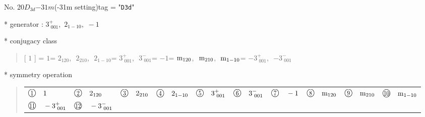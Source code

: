 \documentclass[fleqn,10pt,landscape]{jsarticle}
\begin{document}
\newpage

No. 20\quad$D_{3d}$\quad$-31m$\quad(-31m setting)\quad[ trigonal ]
tag = "{\tt D3d}"

* generator : $3^{+}_{\,\,001},\,\,2{}_{1-10},\,\,-1$

* conjugacy class
\begin{quote}
[ $1$ ] = \quad $1$\newline[ $2{}_{120}$ ] = \quad $2{}_{120}$,\,\, $2{}_{210}$,\,\, $2{}_{1-10}$\newline[ $3^{+}_{\,\,001}$ ] = \quad $3^{+}_{\,\,001}$,\,\, $3^{-}_{\,\,001}$\newline[ $-1$ ] = \quad $-1$\newline[ ${\rm m}_{120}$ ] = \quad ${\rm m}_{120}$,\,\, ${\rm m}_{210}$,\,\, ${\rm m}_{1-10}$\newline[ $-3^{+}_{\,\,001}$ ] = \quad $-3^{+}_{\,\,001}$,\,\, $-3^{-}_{\,\,001}$\newline
\end{quote}

* symmetry operation
\begin{quote}
\begin{tabular}{llllllllll}
$ {\ooalign{\hfil\resizebox{.8\width}{\height}{1}\hfil\crcr\raise.1ex\hbox{\large$\bigcirc$}}}\quad 1 $ & $ {\ooalign{\hfil\resizebox{.8\width}{\height}{2}\hfil\crcr\raise.1ex\hbox{\large$\bigcirc$}}}\quad 2{}_{120} $ & $ {\ooalign{\hfil\resizebox{.8\width}{\height}{3}\hfil\crcr\raise.1ex\hbox{\large$\bigcirc$}}}\quad 2{}_{210} $ & $ {\ooalign{\hfil\resizebox{.8\width}{\height}{4}\hfil\crcr\raise.1ex\hbox{\large$\bigcirc$}}}\quad 2{}_{1-10} $ & $ {\ooalign{\hfil\resizebox{.8\width}{\height}{5}\hfil\crcr\raise.1ex\hbox{\large$\bigcirc$}}}\quad 3^{+}_{\,\,001} $ & $ {\ooalign{\hfil\resizebox{.8\width}{\height}{6}\hfil\crcr\raise.1ex\hbox{\large$\bigcirc$}}}\quad 3^{-}_{\,\,001} $ & $ {\ooalign{\hfil\resizebox{.8\width}{\height}{7}\hfil\crcr\raise.1ex\hbox{\large$\bigcirc$}}}\quad -1 $ & $ {\ooalign{\hfil\resizebox{.8\width}{\height}{8}\hfil\crcr\raise.1ex\hbox{\large$\bigcirc$}}}\quad {\rm m}_{120} $ & $ {\ooalign{\hfil\resizebox{.8\width}{\height}{9}\hfil\crcr\raise.1ex\hbox{\large$\bigcirc$}}}\quad {\rm m}_{210} $ & $ {\ooalign{\hfil\resizebox{.8\width}{\height}{10}\hfil\crcr\raise.1ex\hbox{\large$\bigcirc$}}}\quad {\rm m}_{1-10} $ \\
$ {\ooalign{\hfil\resizebox{.8\width}{\height}{11}\hfil\crcr\raise.1ex\hbox{\large$\bigcirc$}}}\quad -3^{+}_{\,\,001} $ & $ {\ooalign{\hfil\resizebox{.8\width}{\height}{12}\hfil\crcr\raise.1ex\hbox{\large$\bigcirc$}}}\quad -3^{-}_{\,\,001} $ & $  $ & $  $ & $  $ & $  $ & $  $ & $  $ & $  $ & $  $
\end{tabular}
\end{quote}
\end{document}
